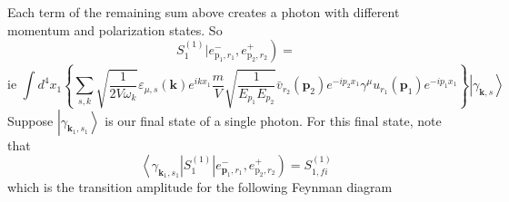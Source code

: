 Each term of the remaining sum above creates a photon with different momentum and polarization states. So
$$
\left.S_{1}^{(1)} | e_{\mathrm{p}_{1}, r_{1}}^{-}, e_{\mathrm{p}_{2}, r_{2}}^{+}\right)=
$$
$$
\text {ie } \int d^{4} x_{1}\left\{\sum_{s, k} \sqrt{\frac{1}{2 V\omega_k}} \varepsilon_{\mu, s}(\mathbf{k}) e^{i kx_1} \frac{m}{V} \sqrt{\frac{1}{E_{p_1} E_{p_{2}}}} \bar{v}_{r_{2}}\left(\mathbf{p}_{2}\right) e^{-i p_{2} x_{1}} \gamma^{\mu} u_{r_1}\left(\mathbf{p}_{1}\right) e^{-i p_{1} x_{1}}\right\}\left|\gamma_{\mathbf{k}, s}\right\rangle
$$
Suppose $\left|\gamma_{\mathbf{k}_1, s_1}\right\rangle$ is our final state of a single photon. For this final state, note that
$$
\left\langle\gamma_{\mathbf{k}_{1},s_{1}}\left|S_{1}^{(1)}\right| e_{\mathbf{p}_{1}, r_{1}}^{-}, e_{\mathrm{p}_{2}, r_{2}}^{+}\right)=S_{1, f i}^{(1)}
$$
which is the transition amplitude for the following Feynman diagram
